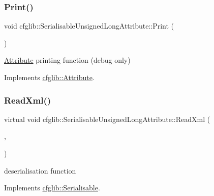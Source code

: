 \subsubsection{\texorpdfstring{Print()}{Print()}}
{\footnotesize\ttfamily void cfglib\+::\+Serialisable\+Unsigned\+Long\+Attribute\+::\+Print (\begin{DoxyParamCaption}\item[{std\+::ostream \&}]{ }\end{DoxyParamCaption})\hspace{0.3cm}{\ttfamily [virtual]}}

\hyperlink{classcfglib_1_1Attribute}{Attribute} printing function (debug only) 

Implements \hyperlink{classcfglib_1_1Attribute_af8d87ceddde146b92727e61823e0129b}{cfglib\+::\+Attribute}.

\mbox{\label{classcfglib_1_1SerialisableUnsignedLongAttribute_acbd51f33a309bb606b7182ab0d49463b}} 
\subsubsection{\texorpdfstring{Read\+Xml()}{ReadXml()}}
{\footnotesize\ttfamily virtual void cfglib\+::\+Serialisable\+Unsigned\+Long\+Attribute\+::\+Read\+Xml (\begin{DoxyParamCaption}\item[{\hyperlink{classXmlTag}{Xml\+Tag} const $\ast$}]{,  }\item[{\hyperlink{classcfglib_1_1Handle}{cfglib\+::\+Handle} \&}]{ }\end{DoxyParamCaption})\hspace{0.3cm}{\ttfamily [virtual]}}

deserialisation function 

Implements \hyperlink{classcfglib_1_1Serialisable_a876d530446317872259356af9b016e13}{cfglib\+::\+Serialisable}.

\mbox{\label{classcfglib_1_1SerialisableUnsignedLongAttribute_a9d6e44a34c15ede16bfb85bd3b817990}} 
